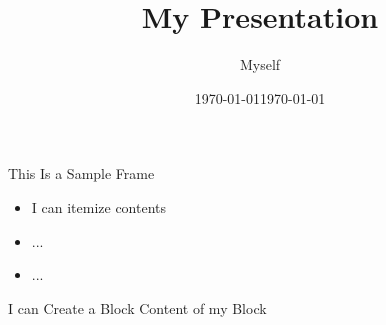 \documentclass{beamer}
\title[My Presentation]{My  Presentation}
\author[Myself]{{Myself}}
\institute[My Institute] 
{\large{\color{black}{My Cool Project}}}
\date{\today}
\date{\today}
\begin{document}
	\begin{frame}
	\titlepage
\end{frame}

\begin{frame}{This Is a Sample Frame}
	\begin{itemize}\setlength\itemsep{1.5em}
   \item I can itemize contents
   \item ...
   \item ...
	\end{itemize}
\vspace{1cm}
\begin{block}{I can Create a Block}
	Content of my Block
\end{block}
\end{frame}
\end{document}

